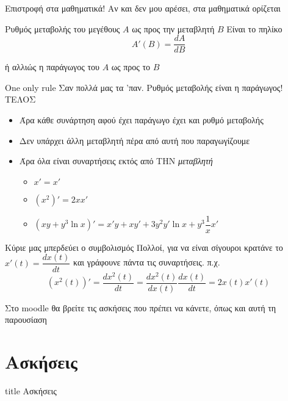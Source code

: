 \documentclass{presentation}
\begin{document}
\begin{frame}{Επιστροφή στα μαθηματικά!}
    Αν και δεν μου αρέσει, στα μαθηματικά ορίζεται
    \begin{block}{Ρυθμός μεταβολής του μεγέθους $A$ ως προς την μεταβλητή $B$}
        Είναι το πηλίκο
        $$Α'(Β)=\frac{dA}{dΒ}$$
    \end{block}
    ή αλλιώς η παράγωγος του $Α$ ως προς το $Β$
\end{frame}

\begin{frame}{One only rule}
    Σαν πολλά μας τα 'παν. Ρυθμός μεταβολής είναι η παράγωγος! ΤΕΛΟΣ
    \begin{itemize}
        \item<2-> Άρα κάθε συνάρτηση αφού έχει παράγωγο έχει και ρυθμό μεταβολής
        \item<3-> Δεν υπάρχει άλλη μεταβλητή πέρα από αυτή που παραγωγίζουμε
        \item<4-> Άρα όλα είναι συναρτήσεις εκτός από ΤΗΝ \emph{μεταβλητή}
            \begin{itemize}
                \item<5-> $x'=x'$
                \item<6-> $(x^2)'=2xx'$
                \item<7-> $(xy+y^3\ln x)'=x'y+xy'+3y^2y'\ln x+y^3\dfrac{1}{x}x'$
            \end{itemize}
    \end{itemize}
\end{frame}

\begin{frame}{Κύριε μας μπερδεύει ο συμβολισμός}
    Πολλοί, για να είναι σίγουροι κρατάνε το $x'(t)=\dfrac{dx(t)}{dt}$ και γράφουνε πάντα τις συναρτήσεις. π.χ.
    $$(x^2(t))'=\frac{dx^2(t)}{dt}=\frac{dx^2(t)}{dx(t)}\frac{dx(t)}{dt}=2x(t)x'(t)$$
\end{frame}

\begin{frame}[noframenumbering]
    Στο moodle θα βρείτε τις ασκήσεις που πρέπει να κάνετε, όπως και αυτή τη παρουσίαση
\end{frame}

\section{Ασκήσεις}

\begin{frame}[noframenumbering]
    \vfill
    \centering
    \begin{beamercolorbox}[sep=8pt,center,shadow=true,rounded=true]{title}
        Ασκήσεις
    \end{beamercolorbox}
    \vfill
\end{frame}
\end{document}
